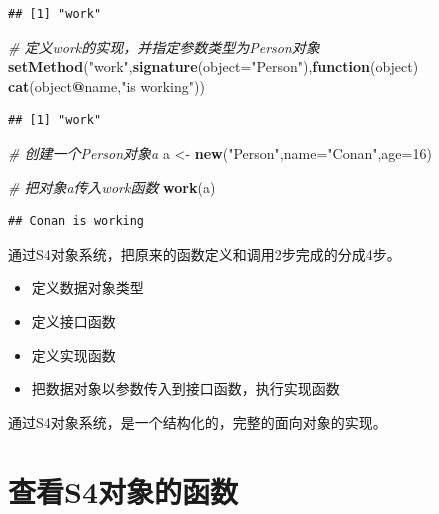 \documentclass[]{book}
\newenvironment{Shaded}{\begin{snugshade}}{\end{snugshade}}
\newcommand{\KeywordTok}[1]{\textcolor[rgb]{0.13,0.29,0.53}{\textbf{#1}}}
\newcommand{\DataTypeTok}[1]{\textcolor[rgb]{0.13,0.29,0.53}{#1}}
\newcommand{\DecValTok}[1]{\textcolor[rgb]{0.00,0.00,0.81}{#1}}
\newcommand{\StringTok}[1]{\textcolor[rgb]{0.31,0.60,0.02}{#1}}
\newcommand{\CommentTok}[1]{\textcolor[rgb]{0.56,0.35,0.01}{\textit{#1}}}
\newcommand{\ControlFlowTok}[1]{\textcolor[rgb]{0.13,0.29,0.53}{\textbf{#1}}}
\newcommand{\OperatorTok}[1]{\textcolor[rgb]{0.81,0.36,0.00}{\textbf{#1}}}
\newcommand{\NormalTok}[1]{#1}
\begin{document}
\begin{verbatim}
## [1] "work"
\end{verbatim}

\begin{Shaded}
\begin{Highlighting}[]
\CommentTok{# 定义work的实现，并指定参数类型为Person对象}
\KeywordTok{setMethod}\NormalTok{(}\StringTok{"work"}\NormalTok{,}\KeywordTok{signature}\NormalTok{(}\DataTypeTok{object=}\StringTok{"Person"}\NormalTok{),}\ControlFlowTok{function}\NormalTok{(object) }\KeywordTok{cat}\NormalTok{(object}\OperatorTok{@}\NormalTok{name,}\StringTok{"is working"}\NormalTok{))}
\end{Highlighting}
\end{Shaded}

\begin{verbatim}
## [1] "work"
\end{verbatim}

\begin{Shaded}
\begin{Highlighting}[]
\CommentTok{# 创建一个Person对象a}
\NormalTok{a <-}\StringTok{ }\KeywordTok{new}\NormalTok{(}\StringTok{"Person"}\NormalTok{,}\DataTypeTok{name=}\StringTok{"Conan"}\NormalTok{,}\DataTypeTok{age=}\DecValTok{16}\NormalTok{)}

\CommentTok{# 把对象a传入work函数}
\KeywordTok{work}\NormalTok{(a)}
\end{Highlighting}
\end{Shaded}

\begin{verbatim}
## Conan is working
\end{verbatim}

通过S4对象系统，把原来的函数定义和调用2步完成的分成4步。

\begin{itemize}
\item
  定义数据对象类型
\item
  定义接口函数
\item
  定义实现函数
\item
  把数据对象以参数传入到接口函数，执行实现函数
\end{itemize}

通过S4对象系统，是一个结构化的，完整的面向对象的实现。

\section{查看S4对象的函数}\label{s4}
\end{document}
